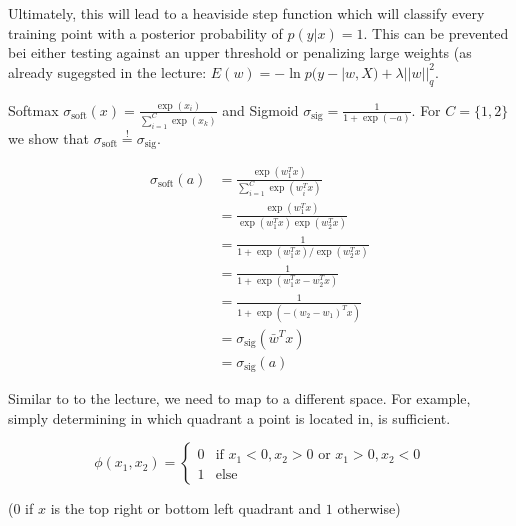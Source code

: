 \begin{flushleft}
Ultimately, this will lead to a heaviside step function which will classify every training point with a posterior probability of $p(y|x) = 1$. This can be prevented bei either testing against an upper threshold or penalizing large weights (as already sugegsted in the lecture: $E(w) = - \ln p(y-|w,X) + \lambda ||w||^2_q$.
\end{flushleft}
%
%
\begin{flushleft}
Softmax $\sigma_\text{soft}(x) = \frac{\exp(x_i)}{\sum_{i=1}^C \exp(x_k)}$
and Sigmoid $\sigma_\text{sig} = \frac{1}{1+\exp(-a)}$. For $C = \{1,2\}$ we show that $\sigma_\text{soft} \overset{!}{=} \sigma_\text{sig}$.
\end{flushleft}
\begin{align*}
  \sigma_\text{soft}(a) &= \frac{\exp(w_1^T x)}{\sum_{i=1}^C \exp(w_i^T x)} \\
  &= \frac{\exp(w_1^T x)}{\exp(w_1^T x) \exp(w_2^T x)} \\
  &= \frac{1}{1+ \exp(w_1^T x) / \exp(w_2^T x)} \\
  &= \frac{1}{1+ \exp(w_1^T x - w_2^T x)} \\
  &= \frac{1}{1+ \exp(-(w_2 - w_1)^T x)} \\
  &= \sigma_\text{sig}(\bar{w}^T x) \\
  &= \sigma_\text{sig}(a)
\end{align*}
%
%
\begin{flushleft}
Similar to to the lecture, we need to map to a different space. For example, simply determining in which quadrant a point is located in, is sufficient. 
\end{flushleft}
\[
\phi(x_1, x_2) = 
  \begin{cases} 
    0 & \text{if } x_1 < 0, x_2 > 0 \text{ or } x_1 > 0, x_2 < 0 \\
    1 & \text{else}
  \end{cases}
\]
\begin{flushleft}
($0$ if $x$ is the top right or bottom left quadrant and $1$ otherwise)
\end{flushleft}




